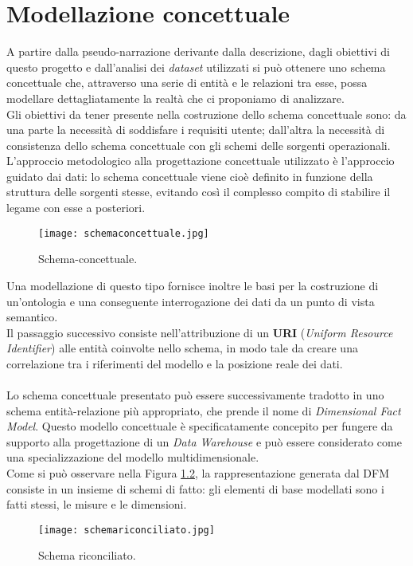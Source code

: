 \chapter{Modellazione concettuale} \label{chap:modellazione_concettuale}
	
	A partire dalla pseudo-narrazione derivante dalla descrizione, dagli obiettivi di questo progetto e dall'analisi dei \textit{dataset} utilizzati si può ottenere uno schema concettuale che, attraverso una serie di entità e le relazioni tra esse, possa modellare dettagliatamente la realtà che ci proponiamo di analizzare.\\
	Gli obiettivi da tener presente nella costruzione dello schema concettuale sono: da una parte la necessità di soddisfare i requisiti utente; dall'altra la necessità di consistenza dello schema concettuale con gli schemi delle sorgenti operazionali.\\
	L'approccio metodologico alla progettazione concettuale utilizzato è l'approccio guidato dai dati: lo schema concettuale viene cioè definito in funzione della struttura delle sorgenti stesse, evitando così il complesso compito di stabilire il legame con esse a posteriori.
	
	\begin{figure}[h!]
		\centering
			\texttt{[image: schemaconcettuale.jpg]}
		\caption{Schema-concettuale.}
		\label{fig:schemaconcettuale}
	\end{figure}
	
	Una modellazione di questo tipo fornisce inoltre le basi per la costruzione di un'ontologia e una conseguente interrogazione dei dati da un punto di vista semantico.\\
	Il passaggio successivo consiste nell'attribuzione di un \textbf{URI} (\textit{Uniform Resource Identifier}) alle entità coinvolte nello schema, in modo tale da creare una correlazione tra i riferimenti del modello e la posizione reale dei dati.\\
	\\
	Lo schema concettuale presentato può essere successivamente tradotto in uno schema entità-relazione più appropriato, che prende il nome di \textit{Dimensional Fact Model}. Questo modello concettuale è specificatamente concepito per fungere da supporto alla progettazione di un \textit{Data Warehouse} e può essere considerato come una specializzazione del modello multidimensionale.\\
	Come si può osservare nella Figura \ref{fig:schemariconciliato}, la rappresentazione generata dal DFM consiste in un insieme di schemi di fatto: gli elementi di base modellati sono i fatti stessi, le misure e le dimensioni.
	
	
	\begin{figure}[h!]
		\centering
			\texttt{[image: schemariconciliato.jpg]}
		\caption{Schema riconciliato.}
		\label{fig:schemariconciliato}
	\end{figure}
